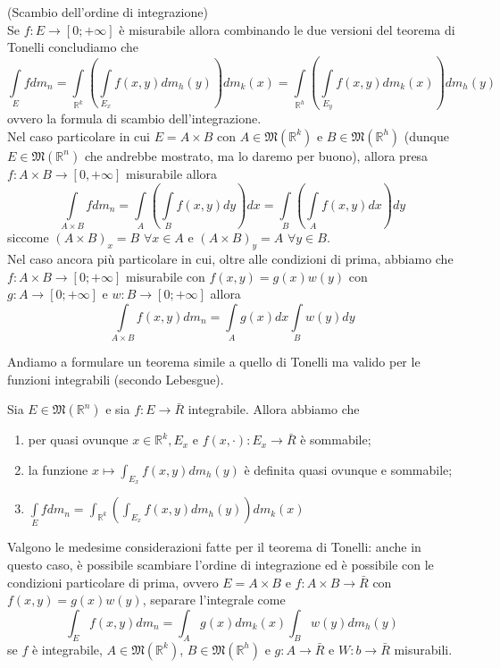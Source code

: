 \begin{remark}(Scambio dell'ordine di integrazione) \\
Se $f: E \to [0; +\infty]$ è misurabile allora combinando le due versioni del teorema di Tonelli concludiamo che
$$
	\int\limits_E fdm_n = \int\limits_{\mathbb{R}^k} \left( \int\limits_{E_x} f(x,y)dm_h(y) \right)dm_k(x) = \int\limits_{\mathbb{R}^h} \left( \int\limits_{E_y} f(x, y)dm_k(x) \right) dm_h(y)
$$
ovvero la formula di scambio dell'integrazione. \\
Nel caso particolare in cui $E = A \times B$ con $A \in \mathfrak{M}(\mathbb{R}^k)$ e $B \in \mathfrak{M}(\mathbb{R}^h)$ (dunque $E \in \mathfrak{M}(\mathbb{R}^n)$ che andrebbe mostrato, ma lo daremo per buono), allora presa $f: A \times B \to [0, +\infty]$ misurabile allora
$$\int\limits_{A \times B} fdm_n = \int\limits_A \left(\int\limits_B f(x, y)dy\right)dx = \int\limits_B \left(\int\limits_A f(x, y)dx\right)dy$$ 
siccome $(A \times B)_x = B \, \, \forall x \in A$ e $(A \times B)_y = A \, \, \forall y \in B$. \\
Nel caso ancora più particolare in cui, oltre alle condizioni di prima, abbiamo che $f: A \times B \to [0; +\infty]$ misurabile con $f(x, y) = g(x)w(y)$ con $g: A \to [0; +\infty]$ e $w: B \to [0;+\infty]$ allora
$$
\int\limits_{A \times B} f(x,y)dm_n = \int\limits_A g(x)dx \int\limits_B w(y)dy
$$
\end{remark}
Andiamo a formulare un teorema simile a quello di Tonelli ma valido per le funzioni integrabili (secondo Lebesgue).
\begin{theorem}[di Fubini]
	Sia $E \in \mathfrak{M}(\mathbb{R}^n)$ e sia $f: E \to \bar{R}$ integrabile. Allora abbiamo che
	\begin{enumerate}[label=\protect\circled{\arabic*}]
		\item per quasi ovunque $x \in \mathbb{R}^k, E_x$ e $f(x, \cdot): E_x \to \bar{R}$ è sommabile;
		\item la funzione $x \mapsto \int_{E_x} f(x, y)dm_h(y)$ è definita quasi ovunque e sommabile;
		\item $\int\limits_E fdm_n = \int_{\mathbb{R}^k} \left( \int_{E_x} f(x, y)dm_h(y) \right) dm_k(x)$ 
	\end{enumerate}
\end{theorem}
\begin{remark}
	Valgono le medesime considerazioni fatte per il teorema di Tonelli: anche in questo caso, è possibile scambiare l'ordine di integrazione
	ed è possibile con le condizioni particolare di prima, ovvero $E=A \times B$ e $f: A \times B \to \bar{R}$ con $f(x, y) = g(x)w(y)$, separare l'integrale come
	$$
	\int_E f(x, y)dm_n = \int_A g(x)dm_k(x) \int_B w(y)dm_h(y)
	$$
	se $f$ è integrabile, $A \in \mathfrak{M}(\mathbb{R}^k)$, $B \in \mathfrak{M}(\mathbb{R}^h)$ e $g: A \to \bar{R}$ e $W: b \to \bar{R}$ misurabili.
\end{remark}
